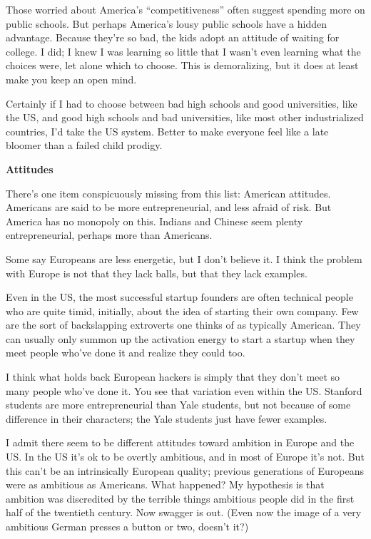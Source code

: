 \documentclass[12pt]{book}
\begin{document}
Those worried about America's ``competitiveness'' often suggest spending
more on public schools. But perhaps America's lousy public schools have
a hidden advantage. Because they're so bad, the kids adopt an attitude
of waiting for college. I did; I knew I was learning so little that I
wasn't even learning what the choices were, let alone which to choose.
This is demoralizing, but it does at least make you keep an open mind.

Certainly if I had to choose between bad high schools and good
universities, like the US, and good high schools and bad universities,
like most other industrialized countries, I'd take the US system. Better
to make everyone feel like a late bloomer than a failed child prodigy.

\textbf{Attitudes}

There's one item conspicuously missing from this list: American
attitudes. Americans are said to be more entrepreneurial, and less
afraid of risk. But America has no monopoly on this. Indians and Chinese
seem plenty entrepreneurial, perhaps more than Americans.

Some say Europeans are less energetic, but I don't believe it. I think
the problem with Europe is not that they lack balls, but that they lack
examples.

Even in the US, the most successful startup founders are often technical
people who are quite timid, initially, about the idea of starting their
own company. Few are the sort of backslapping extroverts one thinks of
as typically American. They can usually only summon up the activation
energy to start a startup when they meet people who've done it and
realize they could too.

I think what holds back European hackers is simply that they don't meet
so many people who've done it. You see that variation even within the
US. Stanford students are more entrepreneurial than Yale students, but
not because of some difference in their characters; the Yale students
just have fewer examples.

I admit there seem to be different attitudes toward ambition in Europe
and the US. In the US it's ok to be overtly ambitious, and in most of
Europe it's not. But this can't be an intrinsically European quality;
previous generations of Europeans were as ambitious as Americans. What
happened? My hypothesis is that ambition was discredited by the terrible
things ambitious people did in the first half of the twentieth century.
Now swagger is out. (Even now the image of a very ambitious German
presses a button or two, doesn't it?)
\end{document}
